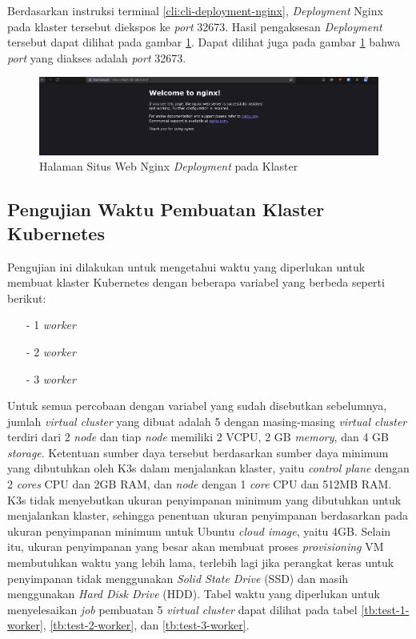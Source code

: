 Berdasarkan instruksi terminal \ref{cli:cli-deployment-nginx}, \emph{Deployment}
Nginx pada klaster tersebut diekspos ke \emph{port} 32673. Hasil pengaksesan
\emph{Deployment} tersebut dapat dilihat pada gambar \ref{fig:nginx-deployment}.
Dapat dilihat juga pada gambar \ref{fig:nginx-deployment} bahwa \emph{port} yang diakses adalah
\emph{port} 32673.

\begin{figure}[H]
  \centering
  \includegraphics[scale=0.3]{gambar/nginx-deployment.png}
  \caption{Halaman Situs Web Nginx \emph{Deployment} pada Klaster}
  \label{fig:nginx-deployment}
\end{figure}

\subsection{Pengujian Waktu Pembuatan Klaster Kubernetes}
\label{subsec:pengujian-deployment}

Pengujian ini dilakukan untuk mengetahui waktu yang diperlukan untuk membuat
klaster Kubernetes dengan beberapa variabel yang berbeda seperti berikut:

\begin{itemize}

  \item[-] 1 \emph{worker}
  
  \item[-] 2 \emph{worker}

  \item[-] 3 \emph{worker}

\end{itemize}

Untuk semua percobaan dengan variabel yang sudah disebutkan sebelumnya, jumlah \emph{virtual cluster}
yang dibuat adalah 5 dengan masing-masing \emph{virtual cluster} terdiri dari 2 \emph{node}
dan tiap \emph{node} memiliki 2 VCPU, 2 GB \emph{memory}, dan 4 GB \emph{storage}. Ketentuan
sumber daya tersebut berdasarkan sumber daya minimum yang dibutuhkan oleh K3s dalam menjalankan
klaster, yaitu \emph{control plane} dengan 2 \emph{cores} CPU dan 2GB RAM, dan \emph{node}
dengan 1 \emph{core} CPU dan 512MB RAM. K3s tidak menyebutkan ukuran penyimpanan minimum yang dibutuhkan
untuk menjalankan klaster, sehingga penentuan ukuran penyimpanan berdasarkan pada ukuran penyimpanan
minimum untuk Ubuntu \emph{cloud image}, yaitu 4GB. Selain itu, ukuran penyimpanan yang besar akan
membuat proses \emph{provisioning} VM membutuhkan waktu yang lebih lama, terlebih lagi jika perangkat
keras untuk penyimpanan tidak menggunakan \emph{Solid State Drive} (SSD) dan masih menggunakan
\emph{Hard Disk Drive} (HDD). Tabel waktu yang diperlukan untuk menyelesaikan \emph{job}
pembuatan 5 \emph{virtual cluster} dapat dilihat pada tabel \ref{tb:test-1-worker}, \ref{tb:test-2-worker},
dan \ref{tb:test-3-worker}.

